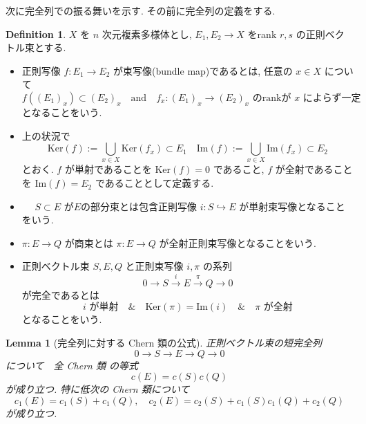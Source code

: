 \documentclass[dvipdfmx,a4paper,11pt]{article} %
\newtheorem{lem}[thm]{Lemma}
\theoremstyle{definition}
\newtheorem{defn}[thm]{Definition}
\theoremstyle{remark}
\numberwithin{equation}{section}
\begin{document}
次に完全列での振る舞いを示す. 
その前に完全列の定義をする. 
\begin{defn}
\(X\) を \(n\) 次元複素多様体とし, \(E_1, E_2\to X\) をrank \(r, s\) の正則ベクトル束とする.
\begin{itemize}
\item 正則写像
\(f : E_1 \to E_2\)
が束写像(bundle map)であるとは, 任意の \(x \in X\) について
\[
f((E_1)_x)\subset (E_2)_x
\quad \text{and} \quad
f_x : (E_1)_x \to (E_2)_x \text{ のrankが }x\text{ によらず一定}
\]
となることをいう.
\item 上の状況で
\[
\mathrm{Ker}(f):=\bigcup_{x \in X}\mathrm{Ker}(f_x) \subset E_1 
\quad 
\mathrm{Im}(f):=\bigcup_{x \in X}\mathrm{Im}(f_x) \subset E_2
\]
とおく. \(f\) が単射であることを \(\mathrm{Ker}(f)=0\) であること, \(f\) が全射であることを \(\mathrm{Im}(f)=E_2\) であることとして定義する.
\item　 \(S \subset E\) が$E$の部分束とは包含正則写像 \(i : S \hookrightarrow E\) が単射束写像となることをいう. 
\item \(\pi : E \to Q\) が商束とは \(\pi : E \to Q\) が全射正則束写像となることをいう.
\item 正則ベクトル束 \(S,E, Q\) と正則束写像 \(i, \pi\) の系列
\[
0\longrightarrow S\overset{i}{\longrightarrow} E \overset{\pi }{\longrightarrow} 
Q \longrightarrow 0
\]
が完全であるとは
\[
\text{\(i\) が単射}
\quad \& \quad 
\mathrm{Ker}(\pi)=\mathrm{Im}(i)
\quad \& \quad 
\text{\(\pi\) が全射}
\]
となることをいう.
\end{itemize}
\end{defn}

\begin{lem}[完全列に対する Chern 類の公式]
\label{lem-chern-exact-for}
正則べクトル束の短完全列
\[
0\longrightarrow S\longrightarrow E\longrightarrow Q\longrightarrow 0
\]
について　全 Chern 類 の等式
\[
c(E)=c(S)c(Q)
\]
が成り立つ. 特に低次の Chern 類について
\[
c_1(E)=c_1(S)+c_1(Q),
\quad
c_2(E)=c_2(S)+c_1(S)c_1(Q)+c_2(Q)
\]
が成り立つ.
\end{lem}
\end{document}
